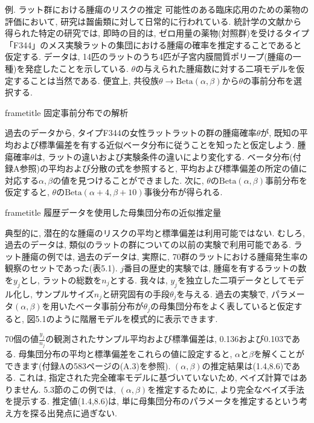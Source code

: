 \documentclass[10pt,dvipdfmx,a4]{beamer}
\newcommand{\dbox}[1]{\begin{beamercolorbox}[wd=122mm, sep=0pt, shadow=false, rounded=false]{frametitle} { #1}\end{beamercolorbox}}
\begin{document}

\begin{frame}{例. ラット群における腫瘍のリスクの推定}
可能性のある臨床応用のための薬物の評価において, 研究は齧歯類に対して日常的に行われている.
統計学の文献から得られた特定の研究では, 即時の目的は, ゼロ用量の薬物(対照群)を受けるタイプ「F344」のメス実験ラットの集団における腫瘍の確率を推定することであると仮定する.
データは, 14匹のラットのうち4匹が子宮内膜間質ポリープ(腫瘍の一種)を発症したことを示している.
$\theta$の与えられた腫瘍数に対する二項モデルを仮定することは当然である.
便宜上, 共役族$\theta\rightarrow\text{Beta}(\alpha,\beta)$から$\theta$の事前分布を選択する.

\dbox{固定事前分布での解析}
過去のデータから, タイプF344の女性ラットラットの群の腫瘍確率$\theta$が, 既知の平均および標準偏差を有する近似ベータ分布に従うことを知ったと仮定しよう.
腫瘍確率$\theta$は, ラットの違いおよび実験条件の違いにより変化する.
ベータ分布(付録A参照)の平均および分散の式を参照すると, 平均および標準偏差の所定の値に対応する$\alpha, \beta$の値を見つけることができました.
次に, $\theta$の$\text{Beta}(\alpha,\beta)$事前分布を仮定すると, $\theta$の$\text{Beta}(\alpha+4,\beta+10)$事後分布が得られる.
\end{frame}


\begin{frame}
\dbox{履歴データを使用した母集団分布の近似推定量}
典型的に, 潜在的な腫瘍のリスクの平均と標準偏差は利用可能ではない.
むしろ, 過去のデータは, 類似のラットの群についての以前の実験で利用可能である.
ラット腫瘍の例では, 過去のデータは, 実際に, 70群のラットにおける腫瘍発生率の観察のセットであった(表5.1).
$j$番目の歴史的実験では, 腫瘍を有するラットの数を$y_j$とし, ラットの総数を$n_j$とする.
我々は, $y_j$を独立した二項データとしてモデル化し, サンプルサイズ$n_j$と研究固有の手段$\theta_j$を与える.
過去の実験で, パラメータ$(\alpha,\beta)$を用いたベータ事前分布が$\theta_j$の母集団分布をよく表していると仮定すると, 図5.1のように階層モデルを模式的に表示できます.

70個の値$\tfrac{y_j}{n_j}$の観測されたサンプル平均および標準偏差は, 0.136および0.103である.
母集団分布の平均と標準偏差をこれらの値に設定すると, $\alpha$と$\beta$を解くことができます(付録Aの583ページの(A.3)を参照).
$(\alpha, \beta)$の推定結果は(1.4,8.6)である.
これは, 指定された完全確率モデルに基づいていないため, ベイズ計算ではありません.
5.3節のこの例では, $(\alpha,\beta)$を推定するために, より完全なベイズ手法を提示する.
推定値(1.4,8.6)は, 単に母集団分布のパラメータを推定するという考え方を探る出発点に過ぎない.
\end{frame}
\end{document}
